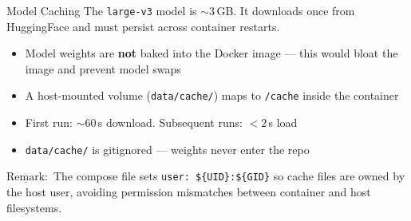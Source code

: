 \documentclass{beamer}
\newcommand{\rmk}{$\underline{\text{Remark}}:$ }
\begin{document}
\begin{frame}{Model Caching}
    The \texttt{large-v3} model is $\sim$3\,GB. It downloads once
    from HuggingFace and must persist across container restarts.

    \vspace{0.6em}
    \begin{itemize}
        \item Model weights are \textbf{not} baked into the Docker image ---
              this would bloat the image and prevent model swaps
        \item A host-mounted volume (\texttt{data/cache/}) maps to
              \texttt{/cache} inside the container
        \item First run: $\sim$60\,s download. Subsequent runs: $< 2$\,s load
        \item \texttt{data/cache/} is gitignored --- weights never enter the repo
    \end{itemize}

    \vspace{0.4em}
    \rmk The compose file sets \texttt{user: \$\{UID\}:\$\{GID\}} so
    cache files are owned by the host user, avoiding permission
    mismatches between container and host filesystems.
\end{frame}
\end{document}
